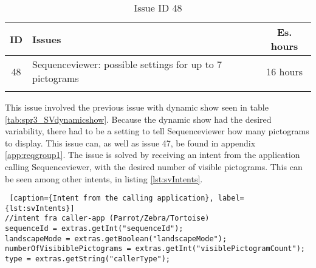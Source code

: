 \begin{longtable} { | c | p{12cm} | c | } 
\hline
	ID 	&	Issues	&		 Es. hours \\\hline
	 48	&	Sequenceviewer: possible settings for up to 7 pictograms	&	16 hours \\\hline
\caption{Issue ID 48}
\label{tab:spr3_SVsettingsupto7pictograms}
\end{longtable}

This issue involved the previous issue with dynamic show seen in table \ref{tab:spr3_SVdynamicshow}. Because the dynamic show had the desired variability, there had to be a setting to tell Sequenceviewer how many pictograms to display. This issue can, as well as issue 47, be found in appendix \ref{app:reqgroup1}. The issue is solved by receiving an intent from the application calling Sequenceviewer, with the desired number of visible pictograms. This can be seen among other intents, in listing \ref{lst:svIntents}.

\begin{lstlisting} [caption={Intent from the calling application}, label={lst:svIntents}]
//intent fra caller-app (Parrot/Zebra/Tortoise)
sequenceId = extras.getInt("sequenceId");
landscapeMode = extras.getBoolean("landscapeMode");
numberOfVisibiblePictograms = extras.getInt("visiblePictogramCount");
type = extras.getString("callerType");
\end{lstlisting}